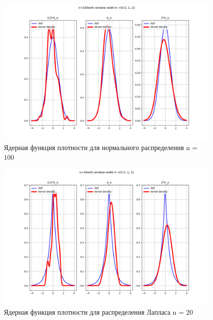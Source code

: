 \documentclass[a4]{article}
\begin{document}
\begin{center}
	\begin{figure}[H]
		\caption{Ядерная функция плотности для нормального распределения n = $100$ }
		\includegraphics[width=\textwidth]{Lab4_normal_pdf_100.png}
	\end{figure}
	
	\begin{figure}[H]
		\caption{Ядерная функция плотности для распределения Лапласа n = $20$ }
		\includegraphics[width=\textwidth]{Lab4_laplace_pdf_20.png} 
	\end{figure}
	

\end{center}
\end{document}

